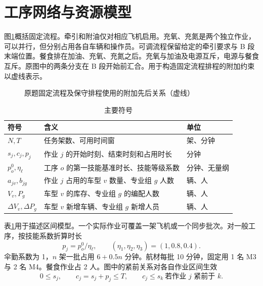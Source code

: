 \documentclass[UTF8,12pt,a4paper,fontset=none]{ctexart}
\begin{document}
\section{工序网络与资源模型}
图\ref{fig:q1-network}概括固定流程。牵引和附油仅对相应飞机启用。充氧、充氮是两个独立作业，可以并行，但分别占用各自车辆和操作员。可调流程保留给定的牵引要求与 B 段末端位置。餐食排在加油、充氧、充氮之后。充氧与加油及电源互斥，电源与餐食互斥。原图中的两条分支在 B 段开始前汇合。用于构造固定流程排程的附加约束以虚线表示。
\begin{figure}[ht]
\centering
{}
\caption{原题固定流程及保守排程使用的附加先后关系（虚线）}
\label{fig:q1-network}
\end{figure}

\begin{table}[ht]
\centering\small
\caption{主要符号}
\label{tab:symbols}
\begin{tabularx}{0.92\linewidth}{lXl}
\toprule
符号 & 含义 & 单位\\
\midrule
$N,T$ & 任务架数、可用时间窗 & 架、分钟\\
$s_j,c_j,p_j$ & 作业 $j$ 的开始时刻、结束时刻和占用时长 & 分钟\\
$p_o^0,\eta_\ell$ & 工序 $o$ 的第一技能基准时长、技能等级系数 & 分钟、无量纲\\
$a_{jv}, b_{jg}$ & 作业 $j$ 占用的车型 $v$ 数量、专业组 $g$ 人数 & 辆、人\\
$V_v,P_g$ & 车型 $v$ 的库存、专业组 $g$ 的编配人数 & 辆、人\\
$\Delta V_v,\Delta P_g$ & 车型 $v$ 新增车辆、专业组 $g$ 新增人员 & 辆、人\\
\bottomrule
\end{tabularx}
\end{table}
表\ref{tab:symbols}用于描述区间模型。一个实际作业可覆盖一架飞机或一个同步批次。对一般工序，按技能系数折算时长
\begin{equation}
p_j=p_o^0/\eta_\ell,\qquad (\eta_1,\eta_2,\eta_3)=(1,0.8,0.4).
\end{equation}
伞勤系数为 1，$n$ 架一批占用 $6+0.5n$ 分钟。航材每批 10 分钟，固定用 1 名 M3 与 2 名 M4。餐食作业占 2 人。图中的紧前关系对各自作业区间生效
\begin{equation}
0\le s_j,\qquad c_j=s_j+p_j\le T,\qquad c_j\le s_k\ \text{若作业 }j\text{ 紧前于 }k.
\end{equation}
\end{document}
